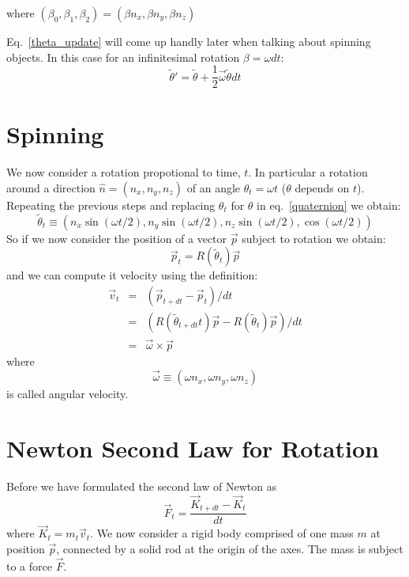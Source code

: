 \documentclass[12pt]{article}
\begin{document}
where $(\beta_0,\beta_1,\beta_2)=(\beta n_x,\beta n_y,\beta n_z)$

Eq.~\ref{theta_update} will come up handly later when talking about spinning objects. In this case for an infinitesimal rotation $\beta=\omega dt$:
\begin{equation}
\tilde \theta' = \tilde \theta + \frac{1}{2}\vec \omega \tilde \theta dt
\end{equation}

\section{Spinning}

We now consider a rotation propotional to time, $t$. In particular a rotation around a direction $\hat n=(n_x,n_y,n_z)$ of an angle $\theta_t = \omega t$ ($\theta$ depends on $t$). Repeating the previous steps and replacing $\theta_t$ for $\theta$ in eq.~\ref{quaternion} we obtain:
\begin{equation}
\tilde \theta_t \equiv (n_x \sin(\omega t/2), n_y \sin(\omega t/2), n_z \sin(\omega t/2),\cos(\omega t/2))
\end{equation}
So if we now consider the position of a vector $\vec p$ subject to rotation we obtain:
\begin{equation}
\vec p_t = R(\tilde \theta_t) \vec p
\label{rottheta}
\end{equation}
and we can compute it velocity using the definition:
\begin{eqnarray}
\vec v_t &=& (\vec p_{t+dt} - \vec p_t)/dt \\
         &=& (R(\tilde \theta_{t+dt}t) \vec p - R(\tilde \theta_t) \vec p)/dt \\
         &=& \vec \omega \times \vec p
\label{vomega}
\end{eqnarray}
where
\begin{equation}
\vec \omega \equiv (\omega n_x, \omega n_y, \omega n_z)
\end{equation}
is called angular velocity.

\section{Newton Second Law for Rotation}

Before we have formulated the second law of Newton as
\begin{equation}
\vec F_t = \frac{\vec K_{t+dt}-\vec K_t}{dt}
\end{equation}
where $\vec K_t = m_t \vec v_t$.
We now consider a rigid body comprised of one mass $m$ at position $\vec p$, connected by a solid rod at the origin of the axes. The mass is subject to a force $\vec F$.
\end{document}
